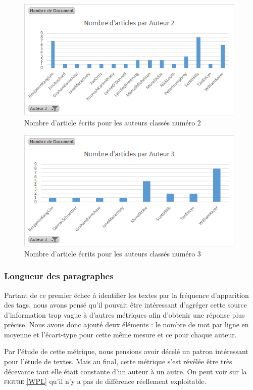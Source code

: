\documentclass[a4paper,12pt]{report}
\begin{document}
\begin{figure}[hbtp]
\centering
\includegraphics[width=11cm]{fig/Auteur2.png}
\caption{Nombre d'article écrits pour les auteurs classés numéro 2}
\label{auteur2}
\end{figure}

\begin{figure}[hbtp]
\centering
\includegraphics[width=11cm]{fig/Auteur3.png}
\caption{Nombre d'article écrits pour les auteurs classés numéro 3}
\label{auteur3}
\end{figure}

\subsubsection{Longueur des paragraphes}

Partant de ce premier échec à identifier les textes par la fréquence d'apparition des tags, nous avons pensé qu'il pouvait être intéressant d’agréger cette source d'information trop vague à d'autres métriques afin d'obtenir une réponse plus précise. Nous avons donc ajouté deux éléments : le nombre de mot par ligne en moyenne et l'écart-type pour cette même mesure et ce pour chaque auteur.

Par l'étude de cette métrique, nous pensions avoir décelé un patron intéressant pour l'étude de textes. Mais au final, cette métrique s'est révélée être très décevante tant elle était constante d'un auteur à un autre. On peut voir sur la \textsc{figure \ref{WPL}} qu'il n'y a pas de différence réellement exploitable.
				
\end{document}
